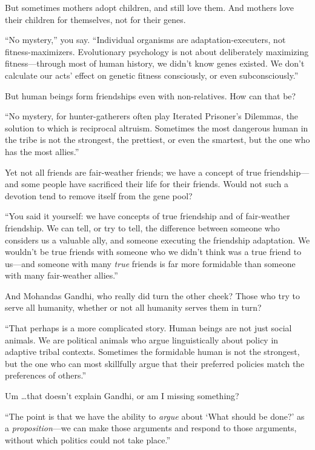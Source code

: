 {
 But sometimes mothers adopt children, and still love them. And
mothers love their children for themselves, not for their genes.}

{
 ``No mystery,'' you say.
``Individual organisms are adaptation-executers, not
fitness-maximizers. Evolutionary psychology is not about deliberately
maximizing fitness---through most of human history, we
didn't know genes existed. We don't
calculate our acts' effect on genetic fitness
consciously, or even subconsciously.''}

{
 But human beings form friendships even with non-relatives. How can
that be?}

{
 ``No mystery, for hunter-gatherers often play
Iterated Prisoner's Dilemmas, the solution to which is
reciprocal altruism. Sometimes the most dangerous human in the tribe is
not the strongest, the prettiest, or even the smartest, but the one who
has the most allies.''}

{
 Yet not all friends are fair-weather friends; we have a concept of
true friendship---and some people have sacrificed their life for their
friends. Would not such a devotion tend to remove itself from the gene
pool?}

{
 ``You said it yourself: we have concepts of true
friendship and of fair-weather friendship. We can tell, or try to tell,
the difference between someone who considers us a valuable ally, and
someone executing the friendship adaptation. We
wouldn't be true friends with someone who we
didn't think was a true friend to us---and someone with
many \textit{true} friends is far more formidable than someone with
many fair-weather allies.''}

{
 And Mohandas Gandhi, who really did turn the other cheek? Those
who try to serve all humanity, whether or not all humanity serves them
in turn?}

{
 ``That perhaps is a more complicated story. Human
beings are not just social animals. We are political animals who argue
linguistically about policy in adaptive tribal contexts. Sometimes the
formidable human is not the strongest, but the one who can most
skillfully argue that their preferred policies match the preferences of
others.''}

{
 Um \ldots that doesn't explain Gandhi, or am I
missing something?}

{
 ``The point is that we have the ability to
\textit{argue} about `What should be
done?' as a \textit{proposition}{}---we can make those
arguments and respond to those arguments, without which politics could
not take place.''}

